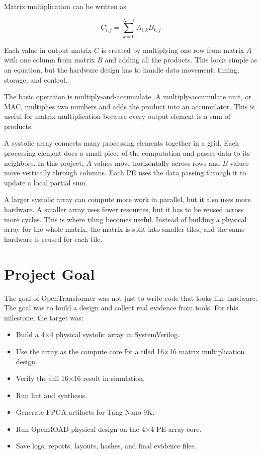 \documentclass[conference]{IEEEtran}
\begin{document}
Matrix multiplication can be written as

\begin{equation}
C_{i,j} = \sum_{k=0}^{N-1} A_{i,k}B_{k,j}
\end{equation}

Each value in output matrix $C$ is created by multiplying one row from matrix $A$ with one column from matrix $B$ and adding all the products. This looks simple as an equation, but the hardware design has to handle data movement, timing, storage, and control.

The basic operation is multiply-and-accumulate. A multiply-accumulate unit, or MAC, multiplies two numbers and adds the product into an accumulator. This is useful for matrix multiplication because every output element is a sum of products.

A systolic array connects many processing elements together in a grid. Each processing element does a small piece of the computation and passes data to its neighbors. In this project, $A$ values move horizontally across rows and $B$ values move vertically through columns. Each PE uses the data passing through it to update a local partial sum.

A larger systolic array can compute more work in parallel, but it also uses more hardware. A smaller array uses fewer resources, but it has to be reused across more cycles. This is where tiling becomes useful. Instead of building a physical array for the whole matrix, the matrix is split into smaller tiles, and the same hardware is reused for each tile.

\section{Project Goal}

The goal of OpenTransformer was not just to write code that looks like hardware. The goal was to build a design and collect real evidence from tools. For this milestone, the target was:

\begin{itemize}
\item Build a 4$\times$4 physical systolic array in SystemVerilog.
\item Use the array as the compute core for a tiled 16$\times$16 matrix multiplication design.
\item Verify the full 16$\times$16 result in simulation.
\item Run lint and synthesis.
\item Generate FPGA artifacts for Tang Nano 9K.
\item Run OpenROAD physical design on the 4$\times$4 PE-array core.
\item Save logs, reports, layouts, hashes, and final evidence files.
\end{itemize}
\end{document}
